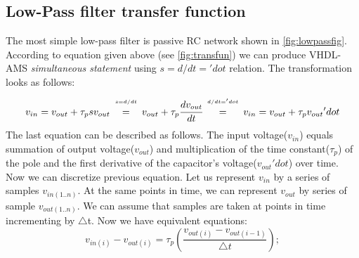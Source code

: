 \documentclass{article}
\begin{document}
\subsection{Low-Pass filter transfer function }
\label{subsec:lptransfunc} 

The most simple low-pass filter is passive RC network 
shown in \autoref{fig:lowpassfig}.
According to equation given above (see \autoref{fig:transfun}) 
we can produce VHDL-AMS \emph{simultaneous statement} using 
\texttt{$s = d/dt = 'dot$} relation.
The transformation looks as follows: \\
\begin{equation}
v_{in} = v_{out} + \tau_psv_{out} 
   \begin{array}[b]{c}                                                                                                                                    
      {\scriptscriptstyle s = d/dt}  \\=                                                                                                                  
   \end{array} 
v_{out} + \tau_p\cfrac{dv_{out}}{dt}
\begin{array}[b]{c}                                                                                                                                    
      {\scriptscriptstyle d/dt = } {\scriptscriptstyle 'dot} \\=                                                                                                                  
   \end{array}
  v_{in} = v_{out} + \tau_pv_{out}{'dot} 
\end{equation} 
 The last equation can be described as follows. 
The input voltage\xspace($v_{in}$)\xspace equals summation 
of output voltage\xspace($v_{out}$)\xspace and multiplication 
of the time constant\xspace($\tau_p$)\xspace of the pole and the
first derivative of the capacitor's voltage\xspace($v_{out}{'dot}$)\xspace 
over time.\\
Now we can discretize previous equation. Let us represent $v_{in}$ by a series 
of samples $v_{in(1..n)}$. At the same points in time, we can represent $v_{out}$ by 
series of sample $v_{out(1..n)}$. We can assume that samples are taken at points in 
time incrementing by $\triangle$t. Now we have equivalent equations:
\begin{equation}
v_{in(i)}- v_{out(i)}=\tau_p(\frac{v_{out(i)}- v_{out(i-1)}} {\triangle t});                                                                                                                  
\end{equation}
\end{document}
